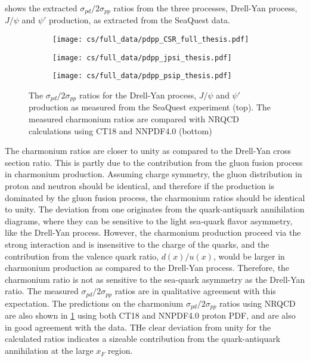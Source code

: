 \documentclass[../main.tex]{subfiles}
\begin{document}
 shows the extracted $\sigma_{pd}/2\sigma_{pp}$ ratios from the three processes,
Drell-Yan process, $J/\psi$ and $\psi'$ production, as extracted from the SeaQuest data.
\begin{figure}[h!]
	\centering
	\begin{subfigure}{0.8\linewidth}
		\texttt{[image: cs/full\_data/pdpp\_CSR\_full\_thesis.pdf]}
	\end{subfigure}
	\begin{subfigure}{0.48\linewidth}
		\texttt{[image: cs/full\_data/pdpp\_jpsi\_thesis.pdf]}
	\end{subfigure}
	\begin{subfigure}{0.48\linewidth}
		\texttt{[image: cs/full\_data/pdpp\_psip\_thesis.pdf]}
	\end{subfigure}
	\caption{The $\sigma_{pd}/2\sigma_{pp}$ ratios for the Drell-Yan process, $J/\psi$ and $\psi'$ production
		as measured from the SeaQuest experiment (top).
		The measured charmonium ratios are compared with NRQCD calculations using CT18 and NNPDF4.0 (bottom)
	}
	\label{fig:csr_all_process}
\end{figure}
The charmonium ratios are closer to unity as compared to the Drell-Yan cross section ratio. This
is partly due to the contribution from the gluon fusion process in charmonium production. Assuming
charge symmetry, the gluon distribution in proton and neutron should be identical, and therefore
if the production is dominated by the gluon fusion process, the charmonium ratios should be identical
to unity. The deviation from one originates from the quark-antiquark annihilation diagrams, where they
can be sensitive to the light sea-quark flavor asymmetry, like the Drell-Yan process. However, the charmonium
production proceed via the strong interaction and is insensitive to the charge of the quarks, and
the contribution from the valence quark ratio, $d(x)/u(x)$, would be larger in charmonium production as compared to the Drell-Yan process.
Therefore, the charmonium ratio is not as sensitive to the sea-quark asymmetry as the Drell-Yan ratio.
The measured $\sigma_{pd}/2\sigma_{pp}$ ratios are in qualitative agreement with this expectation.
The predictions on the charmonium $\sigma_{pd}/2\sigma_{pp}$ ratios using NRQCD are also shown in
\cref{fig:csr_all_process} using both CT18 and NNPDF4.0 proton PDF, and are also in good agreement
with the data. THe clear deviation from unity for the calculated ratios indicates a sizeable
contribution from the quark-antiquark annihilation at the large $x_F$ region.
\FloatBarrier
\end{document}
